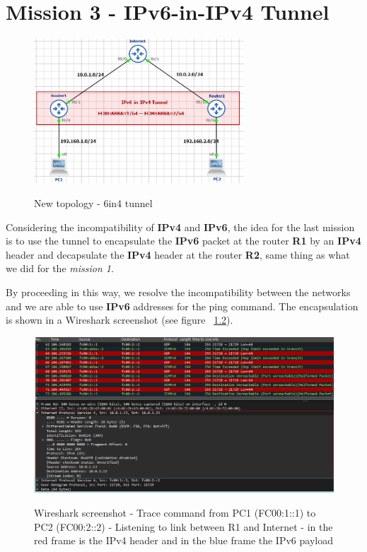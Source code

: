 \documentclass[10pt,a4paper]{ULBreport}
\begin{document}
\chapter{Mission 3 - IPv6-in-IPv4 Tunnel}

\begin{figure}[H]
    \caption{New topology - 6in4 tunnel}
    \centering
    \includegraphics[width=0.7\textwidth]{Images/FinTopo.png}
    \label{Fintopo}
  \end{figure}





Considering the incompatibility of \textbf{IPv4}  and \textbf{IPv6}, the idea for the last mission is to use the tunnel to encapsulate the \textbf{IPv6} packet at the router \textbf{R1} by an \textbf{IPv4}  header and decapsulate the \textbf{IPv4}  header at the router \textbf{R2}, same thing as what we did for the \textit{mission 1}. \par
By proceeding in this way, we resolve the incompatibility between the networks and we are able to use \textbf{IPv6} addresses for the ping command.
The encapsulation is shown in a Wireshark screenshot (see figure ~\ref{fig:Images/Question_4_trace_PC2_Ipv6_Update_Wireshark_R1_internet_2}).

\begin{figure}[H]
  \caption{Wireshark screenshot - Trace command from PC1 (FC00:1::1) to PC2 (FC00:2::2) - Listening to link between R1 and Internet - in the red frame is the IPv4 header and in the blue frame the IPv6 payload}
  \centering
  \includegraphics[width=\textwidth]{Images/traceIPV6.png}
  \label{fig:Images/Question_4_trace_PC2_Ipv6_Update_Wireshark_R1_internet_2}
\end{figure}
\end{document}
